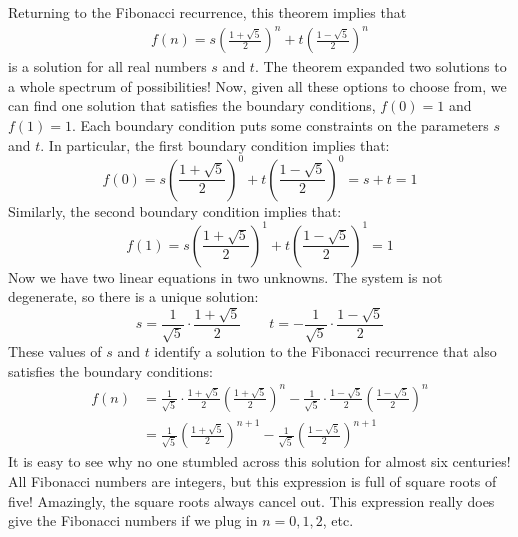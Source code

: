 Returning to the Fibonacci recurrence, this theorem implies that
\begin{align*}
  f(n) = s \left(\frac{1 + \sqrt{5}}{2}\right)^n + t \left(\frac{1 - \sqrt{5}}{2}\right)^n
\end{align*}
is a solution for all real numbers $s$ and $t$.  The theorem expanded
two solutions to a whole spectrum of possibilities!  Now, given all
these options to choose from, we can find one solution that satisfies
the boundary conditions, $f(0) = 1$ and $f(1) = 1$.  Each boundary
condition puts some constraints on the parameters $s$ and $t$.  In
particular, the first boundary condition implies that:
\begin{equation*}
f(0) = s \left(\frac{1 + \sqrt{5}}{2}\right)^0 + t \left(\frac{1 -
    \sqrt{5}}{2}\right)^0 = s + t = 1
\end{equation*}
Similarly, the second boundary condition implies that:
\begin{equation*}
f(1) = s \left(\frac{1 + \sqrt{5}}{2}\right)^1 + t \left(\frac{1 -
    \sqrt{5}}{2}\right)^1 = 1
\end{equation*}
Now we have two linear equations in two unknowns.  The system is not
degenerate, so there is a unique solution:
\begin{equation*}
s = \frac{1}{\sqrt{5}} \cdot \frac{1 + \sqrt{5}}{2}\qquad
t = - \frac{1}{\sqrt{5}} \cdot \frac{1 - \sqrt{5}}{2}
\end{equation*}
These values of $s$ and $t$ identify a solution to the Fibonacci
recurrence that also satisfies the boundary conditions:
\begin{align*}
  f(n) & = \frac{1}{\sqrt{5}} \cdot \frac{1 + \sqrt{5}}{2} \left(\frac{1 + \sqrt{5}}{2}\right)^n-
  \frac{1}{\sqrt{5}} \cdot \frac{1 - \sqrt{5}}{2} \left(\frac{1 - \sqrt{5}}{2}\right)^n \\
  & = \frac{1}{\sqrt{5}} \left(\frac{1 + \sqrt{5}}{2}\right)^{n+1} -
  \frac{1}{\sqrt{5}} \left(\frac{1 - \sqrt{5}}{2}\right)^{n+1}
\end{align*}
It is easy to see why no one stumbled across this solution for almost
six centuries! All Fibonacci numbers are integers, but this expression
is full of square roots of five! Amazingly, the square roots always
cancel out. This expression really does give the Fibonacci numbers if
we plug in $n = 0, 1, 2$, etc.

